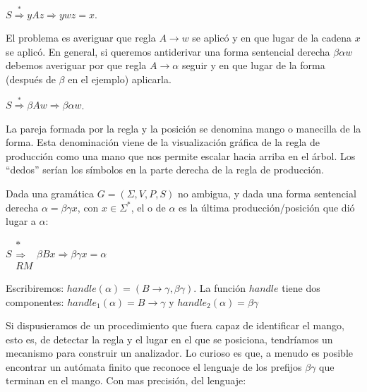 \begin{center}
$S \stackrel{*}{\Longrightarrow} y A z \Longrightarrow y w z = x$. 
\end{center}

El problema es averiguar que regla $A \rightarrow w$ se aplicó y en que lugar 
de la cadena $x$ se aplicó. En general, si queremos antiderivar
una forma sentencial derecha $\beta \alpha w$ 
debemos averiguar por que regla $A \rightarrow \alpha$
seguir y en que lugar de la forma (después de $\beta$ en el ejemplo)
aplicarla. 

\begin{center}
$S \stackrel{*}{\Longrightarrow} \beta A w \Longrightarrow \beta \alpha w$. 
\end{center}

La pareja formada por la regla y la posición 
se denomina mango o manecilla de la forma. Esta denominación viene
de la visualización gráfica de la regla de producción como una mano
que nos permite escalar hacia arriba en el árbol. Los ``dedos'' serían los
símbolos en la parte derecha de la regla de producción.

\begin{definition}
Dada una gramática $G=(\Sigma,V,P,S)$ no ambigua, y dada una forma sentencial derecha 
$\alpha = \beta \gamma x$, con $x \in \Sigma^*$, el  o   de 
$\alpha$ es la última producción/posición  que dió lugar a $\alpha$:

\begin{center}
$ S \begin{array}{c} *\\\Longrightarrow  \\ {\scriptstyle RM} \end{array} \beta B x \Longrightarrow \beta \gamma x = \alpha$
\end{center}

\end{definition}
Escribiremos: 
$handle(\alpha) = (B \rightarrow \gamma, \beta \gamma)$. La función $handle$ tiene dos componentes:
$handle_1(\alpha) = B \rightarrow \gamma$ y 
$handle_2(\alpha) =  \beta \gamma$

Si dispusieramos de un procedimiento que fuera capaz de identificar el mango,
esto es, de detectar la regla y el lugar en el que se posiciona, tendríamos un
mecanismo para construir un analizador. 
Lo curioso es que, a menudo es posible encontrar un autómata finito que
reconoce el lenguaje de los prefijos $\beta \gamma$  que terminan 
en el mango. Con mas precisión, del lenguaje:


